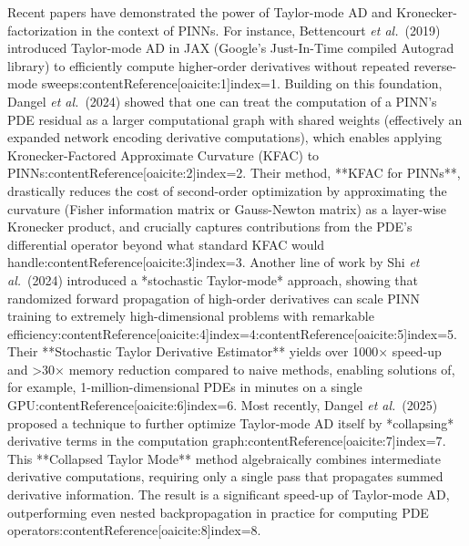 \documentclass[11pt]{article}
\begin{document}
Recent papers have demonstrated the power of Taylor-mode AD and Kronecker-factorization in the context of PINNs. For instance, Bettencourt \textit{et al.}\ (2019) introduced Taylor-mode AD in JAX (Google's Just-In-Time compiled Autograd library) to efficiently compute higher-order derivatives without repeated reverse-mode sweeps:contentReference[oaicite:1]{index=1}. Building on this foundation, Dangel \textit{et al.}\ (2024) showed that one can treat the computation of a PINN's PDE residual as a larger computational graph with shared weights (effectively an expanded network encoding derivative computations), which enables applying Kronecker-Factored Approximate Curvature (KFAC) to PINNs:contentReference[oaicite:2]{index=2}. Their method, **KFAC for PINNs**, drastically reduces the cost of second-order optimization by approximating the curvature (Fisher information matrix or Gauss-Newton matrix) as a layer-wise Kronecker product, and crucially captures contributions from the PDE's differential operator beyond what standard KFAC would handle:contentReference[oaicite:3]{index=3}. Another line of work by Shi \textit{et al.}\ (2024) introduced a *stochastic Taylor-mode* approach, showing that randomized forward propagation of high-order derivatives can scale PINN training to extremely high-dimensional problems with remarkable efficiency:contentReference[oaicite:4]{index=4}:contentReference[oaicite:5]{index=5}. Their **Stochastic Taylor Derivative Estimator** yields over 1000× speed-up and >30× memory reduction compared to naive methods, enabling solutions of, for example, 1-million-dimensional PDEs in minutes on a single GPU:contentReference[oaicite:6]{index=6}. Most recently, Dangel \textit{et al.}\ (2025) proposed a technique to further optimize Taylor-mode AD itself by *collapsing* derivative terms in the computation graph:contentReference[oaicite:7]{index=7}. This **Collapsed Taylor Mode** method algebraically combines intermediate derivative computations, requiring only a single pass that propagates summed derivative information. The result is a significant speed-up of Taylor-mode AD, outperforming even nested backpropagation in practice for computing PDE operators:contentReference[oaicite:8]{index=8}.
\end{document}
